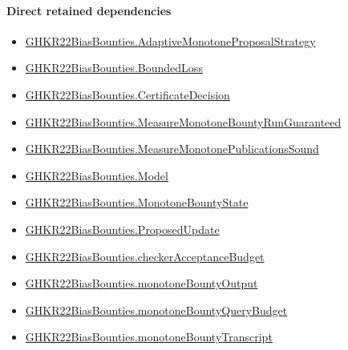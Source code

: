 \documentclass[10pt]{article}
\begin{document}
\paragraph{Direct retained dependencies}
\begin{itemize}\raggedright
\item \hyperlink{governing-declaration-975ce4ec5f91862b}{GHKR22\allowbreak{}Bias\allowbreak{}Bounties.\allowbreak{}Adaptive\allowbreak{}Monotone\allowbreak{}Proposal\allowbreak{}Strategy}
\item \hyperlink{paper-prerequisite-ef6c319b0770dad4}{GHKR22\allowbreak{}Bias\allowbreak{}Bounties.\allowbreak{}Bounded\allowbreak{}Loss}
\item \hyperlink{governing-declaration-7881732e3fc3c15e}{GHKR22\allowbreak{}Bias\allowbreak{}Bounties.\allowbreak{}Certificate\allowbreak{}Decision}
\item \hyperlink{governing-declaration-f8541951a595d742}{GHKR22\allowbreak{}Bias\allowbreak{}Bounties.\allowbreak{}Measure\allowbreak{}Monotone\allowbreak{}Bounty\allowbreak{}Run\allowbreak{}Guaranteed}
\item \hyperlink{governing-declaration-b1ecbccebdadd804}{GHKR22\allowbreak{}Bias\allowbreak{}Bounties.\allowbreak{}Measure\allowbreak{}Monotone\allowbreak{}Publications\allowbreak{}Sound}
\item \hyperlink{paper-prerequisite-333127605c12eba8}{GHKR22\allowbreak{}Bias\allowbreak{}Bounties.\allowbreak{}Model}
\item \hyperlink{governing-declaration-95acf4a72cd8625a}{GHKR22\allowbreak{}Bias\allowbreak{}Bounties.\allowbreak{}Monotone\allowbreak{}Bounty\allowbreak{}State}
\item \hyperlink{governing-declaration-e47349c87d11953f}{GHKR22\allowbreak{}Bias\allowbreak{}Bounties.\allowbreak{}Proposed\allowbreak{}Update}
\item \hyperlink{paper-prerequisite-3296eacfe5745d61}{GHKR22\allowbreak{}Bias\allowbreak{}Bounties.\allowbreak{}checker\allowbreak{}Acceptance\allowbreak{}Budget}
\item \hyperlink{paper-prerequisite-b5889905f0c62bd2}{GHKR22\allowbreak{}Bias\allowbreak{}Bounties.\allowbreak{}monotone\allowbreak{}Bounty\allowbreak{}Output}
\item \hyperlink{governing-declaration-8e4ae409a7332d6c}{GHKR22\allowbreak{}Bias\allowbreak{}Bounties.\allowbreak{}monotone\allowbreak{}Bounty\allowbreak{}Query\allowbreak{}Budget}
\item \hyperlink{governing-declaration-5c79f2a442dffa5d}{GHKR22\allowbreak{}Bias\allowbreak{}Bounties.\allowbreak{}monotone\allowbreak{}Bounty\allowbreak{}Transcript}
\end{itemize}
\hypertarget{governing-declaration-c57b00de25674c10}{}
\end{document}
